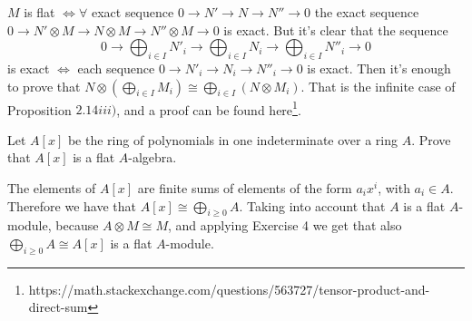 \begin{sol}
    $M$ is flat $\iff \forall$ exact sequence $0 \to N' \to N \to N'' \to 0$ the exact sequence $0 \to N' \otimes M \to N \otimes M \to N'' \otimes M \to 0$ is exact. But it's clear that the sequence
	\[
		0 \to \bigoplus_{i \in I} N'_i \to \bigoplus_{i \in I} N_i \to \bigoplus_{i \in I} N''_i \to 0
	\]
	is exact $\iff$ each sequence $0 \to N'_i \to N_i \to N''_i \to 0$ is exact. Then it's enough to prove that $N \otimes (\bigoplus_{i \in I} M_i) \cong \bigoplus_{i \in I} (N \otimes M_i)$.  That is the infinite case of Proposition $2.14 iii)$, and a proof can be found here\footnote{https://math.stackexchange.com/questions/563727/tensor-product-and-direct-sum}.




\end{sol}

\begin{ex}
Let $A[x]$ be the ring of polynomials in one indeterminate over a ring $A$. Prove that $A[x]$ is a flat $A$-algebra.
\end{ex}

\begin{sol}
	The elements of $A[x]$ are finite sums of elements of the form $a_i x^i$, with $a_i \in A$. Therefore we have that $A[x] \cong \bigoplus_{i \geq 0} A$. Taking into account that $A$ is a flat $A$-module, because $A \otimes M \cong M$, and applying Exercise 4 we get that also $\bigoplus_{i \geq 0} A \cong A[x]$ is a flat $A$-module. 
\end{sol}

